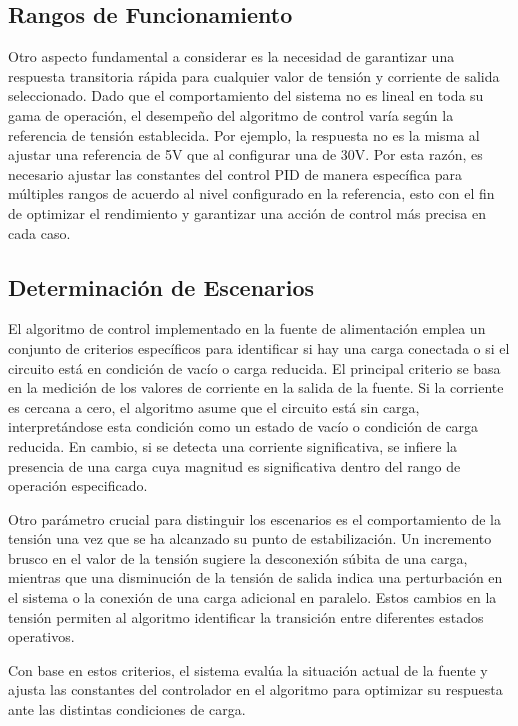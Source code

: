 \subsection{Rangos de Funcionamiento}
Otro aspecto fundamental a considerar es la necesidad de garantizar una respuesta transitoria rápida para cualquier valor de tensión y corriente de salida seleccionado. Dado que el comportamiento del sistema no es lineal en toda su gama de operación, el desempeño del algoritmo de control varía según la referencia de tensión establecida. Por ejemplo, la respuesta no es la misma al ajustar una referencia de 5V que al configurar una de 30V. Por esta razón, es necesario ajustar las constantes del control PID de manera específica para múltiples rangos de acuerdo al nivel configurado en la referencia, esto con el fin de optimizar el rendimiento y garantizar una acción de control más precisa en cada caso.\par

\subsection{Determinación de Escenarios}
El algoritmo de control implementado en la fuente de alimentación emplea un conjunto de criterios específicos para identificar si hay una carga conectada o si el circuito está en condición de vacío o carga reducida. El principal criterio se basa en la medición de los valores de corriente en la salida de la fuente. Si la corriente es cercana a cero, el algoritmo asume que el circuito está sin carga, interpretándose esta condición como un estado de vacío o condición de carga reducida. En cambio, si se detecta una corriente significativa, se infiere la presencia de una carga cuya magnitud es significativa dentro del rango de operación especificado. \par
Otro parámetro crucial para distinguir los escenarios es el comportamiento de la tensión una vez que se ha alcanzado su punto de estabilización. Un incremento brusco en el valor de la tensión sugiere la desconexión súbita de una carga, mientras que una disminución de la tensión de salida indica una perturbación en el sistema o la conexión de una carga adicional en paralelo. Estos cambios en la tensión permiten al algoritmo identificar la transición entre diferentes estados operativos.\par
Con base en estos criterios, el sistema evalúa la situación actual de la fuente y ajusta las constantes del controlador en el algoritmo para optimizar su respuesta ante las distintas condiciones de carga.\par


